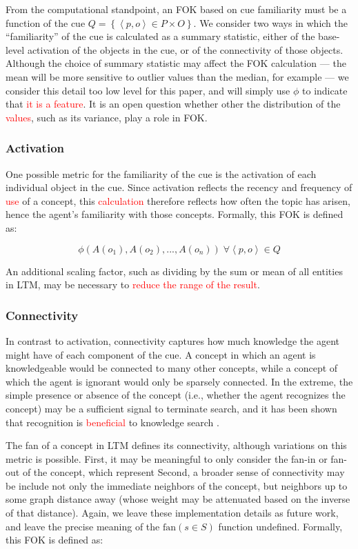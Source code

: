 \documentclass[10pt,letterpaper]{article}
\newcommand{\fixme}[2][]{#2}
\renewcommand{\fixme}[2][]{\textcolor{red}{#2}}
\newcommand{\setof}[1]{\left \{ #1 \right \}}
\newcommand{\tuple}[1]{\left \langle #1 \right \rangle }
\begin{document}
From the computational standpoint, an FOK based on cue familiarity must be a function of the cue $Q = \setof{\tuple{p, o}{\in}P{\times}O}$.
We consider two ways in which the ``familiarity'' of the cue is calculated as a summary statistic, either of the base-level activation of the objects in the cue, or of the connectivity of those objects.
Although the choice of summary statistic may affect the FOK calculation --- the mean will be more sensitive to outlier values than the median, for example --- we consider this detail too low level for this paper, and will simply use $\phi$ to indicate that \fixme{it is a feature}.
It is an open question whether other the distribution of the \fixme{values}, such as its variance, play a role in FOK.

\subsubsection{Activation}

One possible metric for the familiarity of the cue is the activation of each individual object in the cue.
Since activation reflects the recency and frequency of \fixme{use} of a concept, this \fixme{calculation} therefore reflects how often the topic has arisen, hence the agent's familiarity with those concepts.
Formally, this FOK is defined as:

$$\phi\left(A(o_1), A(o_2), ..., A(o_n)\right) \; \forall {\tuple{p, o}{\in}Q}$$

An additional scaling factor, such as dividing by the sum or mean of all entities in LTM, may be necessary to \fixme{reduce the range of the result}.

\subsubsection{Connectivity}

In contrast to activation, connectivity captures how much knowledge the agent might have of each component of the cue.
A concept in which an agent is knowledgeable would be connected to many other concepts, while a concept of which the agent is ignorant would only be sparsely connected.
In the extreme, the simple presence or absence of the concept (i.e., whether the agent recognizes the concept) may be a sufficient signal to terminate search, and it has been shown that recognition is \fixme{beneficial} to knowledge search \cite{Li2012FunctionalInteractionsBetween}.

The fan of a concept in LTM defines its connectivity, although variations on this metric is possible.
First, it may be meaningful to only consider the fan-in or fan-out of the concept, which represent 
Second, a broader sense of connectivity may be include not only the immediate neighbors of the concept, but neighbors up to some graph distance away (whose weight may be attenuated based on the inverse of that distance).
Again, we leave these implementation details as future work, and leave the precise meaning of the $\text{fan}(s{\in}S)$ function undefined.
Formally, this FOK is defined as:
\end{document}
